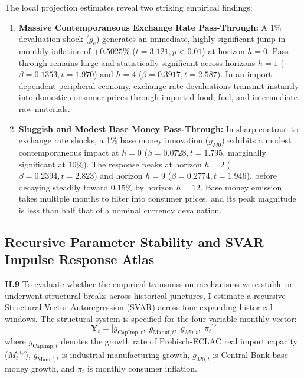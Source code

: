 The local projection estimates reveal two striking empirical findings:
\begin{enumerate}[leftmargin=2em]
	\item \textbf{Massive Contemporaneous Exchange Rate Pass-Through:} A 1\% devaluation shock ($g_e$) generates an immediate, highly significant jump in monthly inflation of $+0.5025\%$ ($t = 3.121, p < 0.01$) at horizon $h=0$. Pass-through remains large and statistically significant across horizons $h=1$ ($\beta = 0.1353, t = 1.970$) and $h=4$ ($\beta = 0.3917, t = 2.587$). In an import-dependent peripheral economy, exchange rate devaluations transmit instantly into domestic consumer prices through imported food, fuel, and intermediate raw materials.
	\item \textbf{Sluggish and Modest Base Money Pass-Through:} In sharp contrast to exchange rate shocks, a 1\% base money innovation ($g_{M0}$) exhibits a modest contemporaneous impact at $h=0$ ($\beta = 0.0728, t = 1.795$, marginally significant at 10\%). The response peaks at horizon $h=2$ ($\beta = 0.2394, t = 2.823$) and horizon $h=9$ ($\beta = 0.2774, t = 1.946$), before decaying steadily toward $0.15\%$ by horizon $h=12$. Base money emission takes multiple months to filter into consumer prices, and its peak magnitude is less than half that of a nominal currency devaluation.
\end{enumerate}

\subsection{Recursive Parameter Stability and SVAR Impulse Response Atlas}
\label{app:recursive_svar_irfs}

\textbf{H.9} To evaluate whether the empirical transmission mechanisms were stable or underwent structural breaks across historical junctures, I estimate a recursive Structural Vector Autoregression (SVAR) across four expanding historical windows. The structural system is specified for the four-variable monthly vector:
\begin{equation}
	\mathbf{Y}_t = \big[ g_{\text{CapImp},t},\; g_{\text{Manuf},t},\; g_{M0,t},\; \pi_t \big]'
	\label{eq:app_svar_vector}
\end{equation}
where $g_{\text{CapImp},t}$ denotes the growth rate of Prebisch-ECLAC real import capacity ($M^{\text{cap}}_t$), $g_{\text{Manuf},t}$ is industrial manufacturing growth, $g_{M0,t}$ is Central Bank base money growth, and $\pi_t$ is monthly consumer inflation.

